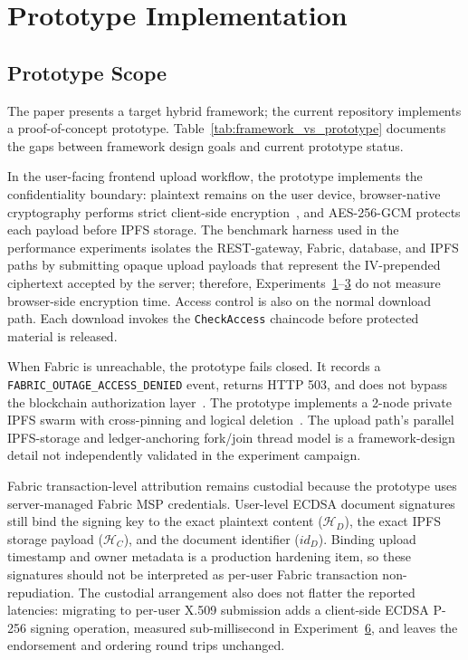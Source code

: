 \documentclass[preprint,12pt]{elsarticle}
\begin{document}
\section{Prototype Implementation}
\label{sec:prototype_implementation}

\subsection{Prototype Scope}
\label{sec:prototype_scope}

The paper presents a target hybrid framework; the current repository
implements a proof-of-concept prototype. Table~\ref{tab:framework_vs_prototype}
documents the gaps between framework design goals and current prototype
status.

In the user-facing frontend upload workflow, the prototype implements the
confidentiality boundary: plaintext remains on the user device, browser-native
cryptography performs strict client-side encryption~\cite{fips197,w3cWebCrypto},
and AES-256-GCM protects each payload before IPFS storage. The benchmark
harness used in the performance experiments isolates the REST-gateway,
Fabric, database, and IPFS paths by submitting opaque upload payloads that
represent the IV-prepended ciphertext accepted by the server; therefore,
Experiments~\hyperref[sec:exp_scalability]{1}--\hyperref[sec:exp_filesize]{3}
do not measure browser-side encryption time. Access control is also on the
normal download path. Each download invokes the \texttt{CheckAccess}
chaincode before protected material is released.

When Fabric is unreachable, the prototype fails closed. It records a
\texttt{FABRIC\_OUTAGE\_ACCESS\_DENIED} event, returns HTTP 503, and does
not bypass the blockchain authorization layer~\cite{RBACSandhu}. The
prototype implements a 2-node private IPFS swarm with cross-pinning and
logical deletion~\cite{politou2019metadata,finck2019blockchain}. The
upload path's parallel IPFS-storage and ledger-anchoring fork/join
thread model is a framework-design detail not independently validated
in the experiment campaign.

Fabric transaction-level attribution remains custodial because the
prototype uses server-managed Fabric MSP credentials. User-level ECDSA
document signatures still bind the signing key to the exact plaintext
content ($\mathcal{H}_D$), the exact IPFS storage payload
($\mathcal{H}_C$), and the document identifier ($id_D$). Binding upload
timestamp and owner metadata is a production hardening item, so these
signatures should not be interpreted as per-user Fabric transaction
non-repudiation. The custodial arrangement also does not flatter the
reported latencies: migrating to per-user X.509 submission adds a
client-side ECDSA P-256 signing operation, measured sub-millisecond in
Experiment~\hyperref[sec:exp_crypto]{6}, and leaves the endorsement and
ordering round trips unchanged.
\end{document}
